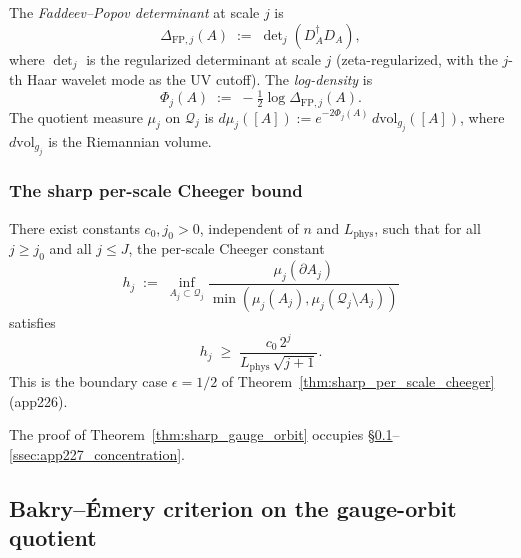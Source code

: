 \begin{definition}
\label{def:fp_det}
The \emph{Faddeev--Popov determinant} at scale $j$ is
\begin{equation}
\label{eq:fp_det}
  \Delta_{\mathrm{FP},j}(A)
  \;:=\;\det\nolimits_{j}(D_{A}^{\dagger}D_{A}),
\end{equation}
where $\det_{j}$ is the regularized determinant at scale $j$
(zeta-regularized, with the $j$-th Haar wavelet mode as the UV
cutoff). The \emph{log-density} is
\begin{equation}
\label{eq:fp_logdensity}
  \Phi_{j}(A)\;:=\;-\tfrac{1}{2}\log\Delta_{\mathrm{FP},j}(A).
\end{equation}
The quotient measure $\mu_{j}$ on $\mathcal{Q}_{j}$ is
$d\mu_{j}([A]):=e^{-2\Phi_{j}(A)}\,d\mathrm{vol}_{g_{j}}([A])$,
where $d\mathrm{vol}_{g_{j}}$ is the Riemannian volume.
\end{definition}

\subsubsection{The sharp per-scale Cheeger bound}

\begin{theorem}
\label{thm:sharp_gauge_orbit}
There exist constants $c_{0},j_{0}>0$, independent of $n$ and
$L_{\mathrm{phys}}$, such that for all $j\ge j_{0}$ and all
$j\le J$, the per-scale Cheeger constant
\begin{equation}
\label{eq:sharp_gauge_orbit}
  h_{j}
  \;:=\;\inf_{A_{j}\subset\mathcal{Q}_{j}}
  \frac{\mu_{j}(\partial A_{j})}{\min(\mu_{j}(A_{j}),
  \mu_{j}(\mathcal{Q}_{j}\setminus A_{j}))}
\end{equation}
satisfies
\begin{equation}
\label{eq:sharp_bound_app227}
  h_{j}\;\ge\;\frac{c_{0}\,2^{j}}{L_{\mathrm{phys}}\,\sqrt{j+1}}.
\end{equation}
This is the boundary case $\epsilon=1/2$ of
Theorem~\ref{thm:sharp_per_scale_cheeger} (app226).
\end{theorem}

The proof of Theorem~\ref{thm:sharp_gauge_orbit} occupies
\S\ref{ssec:app227_be}--\ref{ssec:app227_concentration}.

\subsection{Bakry--\'Emery criterion on the gauge-orbit quotient}
\label{ssec:app227_be}

